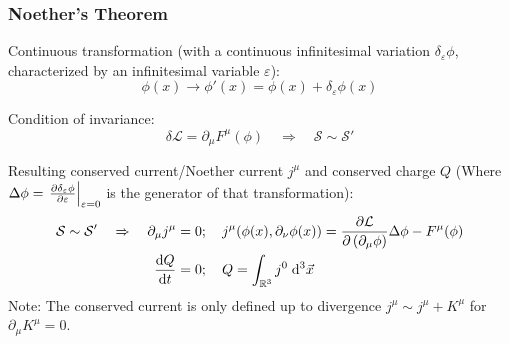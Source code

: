 		\subsubsection{Noether's Theorem}
			\noindent
			Continuous transformation (with a continuous infinitesimal variation $\delta_\varepsilon \phi$, characterized by an infinitesimal variable $\varepsilon$):
			\begin{equation}
				\phi(x)\rightarrow\phi'(x) = \phi(x) + \delta_\varepsilon \phi(x)
			\end{equation}
			
			\noindent
			Condition of invariance:
			\begin{equation}
				\delta\mathcal{L} = \partial_\mu F^\mu(\phi) 
				\quad \Rightarrow \quad \mathcal{S} \sim \mathcal{S}'
			\end{equation}

			\noindent
			Resulting conserved current/Noether current $j^{\mu}$ and conserved charge $Q$ (Where $\Delta \phi = \eval{\pdv{\delta_\varepsilon \phi}{\varepsilon}}_{\varepsilon=0}$ is the generator of that transformation):
			\begin{equation}
				\begin{aligned}
					\mathcal{S} \sim \mathcal{S}' \quad\Rightarrow\quad 
					\partial_\mu j^\mu &= 0;\quad
					j^\mu \qty( \phi(x), \partial_\nu\phi(x) ) = \pdv{\mathcal{L}}{\left(\partial_\mu \phi\right)}\Delta\phi - F^\mu(\phi) \\
					\dv{Q}{t} &= 0; \quad Q = \int_{\mathbb{R}^3} j^0\;\dd^3\vec{x} \\
				\end{aligned}
			\end{equation}
			Note: The conserved current is only defined up to divergence $j^\mu \sim j^\mu + K^\mu$ for $\partial_\mu K^\mu = 0$.
